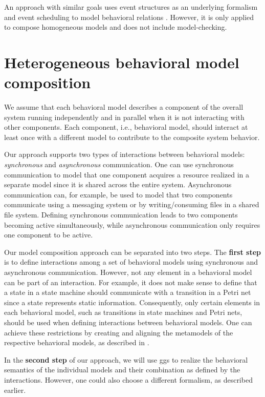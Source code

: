 \documentclass[a4paper]{easychair}
\begin{document}
An approach with similar goals uses event structures as an underlying formalism and event scheduling to model behavioral relations \cite{kienzleUnifyingFrameworkHomogeneous2019}.
However, it is only applied to compose homogeneous models and does not include model-checking.

\section{Heterogeneous behavioral model composition}
We assume that each behavioral model describes a component of the overall system running independently and in parallel when it is not interacting with other components.
Each component, i.e., behavioral model, should interact at least once with a different model to contribute to the composite system behavior.

Our approach supports two types of interactions between behavioral models: \textit{synchronous} and \textit{asynchronous} communication.
One can use synchronous communication to model that one component acquires a resource realized in a separate model since it is shared across the entire system.
Asynchronous communication can, for example, be used to model that two components communicate using a messaging system or by writing/consuming files in a shared file system.
Defining synchronous communication leads to two components becoming active simultaneously, while asynchronous communication only requires one component to be active. 

Our model composition approach can be separated into two steps.
The \textbf{first step} is to define interactions among a set of behavioral models using synchronous and asynchronous communication.
However, not any element in a behavioral model can be part of an interaction.
For example, it does not make sense to define that a state in a state machine should communicate with a transition in a Petri net since a state represents static information.
Consequently, only certain elements in each behavioral model, such as transitions in state machines and Petri nets, should be used when defining interactions between behavioral models.
One can achieve these restrictions by creating and aligning the metamodels of the respective behavioral models, as described in \cite{krauterBehavioralConsistencyHeterogeneous2021}.

In the \textbf{second step} of our approach, we will use \glspl*{gg} to realize the behavioral semantics of the individual models and their combination as defined by the interactions.
However, one could also choose a different formalism, as described earlier.
\end{document}
